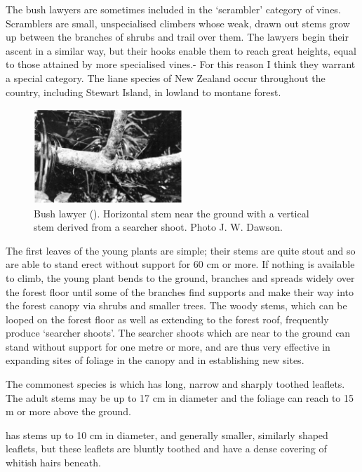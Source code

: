 The bush lawyers are sometimes included in the `scrambler' category of vines.
Scramblers are small, unspecialised climbers whose weak, drawn out stems grow up between the branches of shrubs and trail over them.
The lawyers begin their ascent in a similar way, but their hooks enable them to reach great heights, equal to those attained by more specialised vines.- For this reason I think they warrant a special category.
The liane species of New Zealand  occur throughout the country, including Stewart Island, in lowland to montane forest.

\begin{figure}
	\includegraphics[width=0.5\textwidth]{graphics/figure36bushlawyer.jpg}
	\centering
	\caption[Bush lawyer]{Bush lawyer ().
    Horizontal stem near the ground with a vertical stem derived from a searcher shoot.
    Photo  J. W. Dawson.}
	\label{fig:36bushlawyer}
\end{figure}

The first leaves of the young plants are simple; their stems are quite stout and so are able to stand erect without support for 60 cm or more.
If nothing is available to climb, the young plant bends to the ground, branches and spreads widely over the forest floor until some of the branches find supports and make their way into the forest canopy via shrubs and smaller trees.
The woody stems, which can be looped on the forest floor as well as extending to the forest roof, frequently produce `searcher shoots'.
The searcher shoots which are near to the ground can stand without support for one metre or more, and are thus very effective in expanding sites of  foliage in the canopy and in establishing new sites.

The commonest species is  which has long, narrow and sharply toothed leaflets.
The adult stems may be up to 17 cm in diameter and the foliage can reach to 15 m or more above the ground.

 has stems up to 10 cm in diameter, and generally smaller, similarly shaped leaflets, but these leaflets are bluntly toothed and have a dense covering of whitish hairs beneath.

